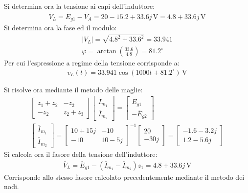 \documentclass{article}
\newcommand{\SI}[1]{\,\mathrm{#1}}
\begin{document}
Si determina ora la tensione ai capi dell'induttore:
\begin{gather*}
    \overline{V}_L=\overline{E}_{g1}-\overline{V}_A=20-15.2+33.6j\SI{V}=4.8+33.6j\SI{V}
\end{gather*}
Si determina ora la fase ed il modulo:
\begin{gather*}
    |V_L|=\sqrt{4.8^2+33.6^2}=33.941\\
    \varphi=\arctan\left(\displaystyle\frac{33.6}{4.8}\right)=81.2^{\circ}
\end{gather*}
Per cui l'espressione a regime della tensione corrisponde a:
\begin{gather}
    v_L(t)=33.941\cos(1000t+81.2^{\circ})\SI{V}
\end{gather}

Si risolve ora mediante il metodo delle maglie:
\begin{gather*}
    \begin{bmatrix}
        z_1+z_2&-z_2\\-z_2&z_2+z_3
    \end{bmatrix}\begin{bmatrix}
        \overline{I}_{m_1}\\\overline{I}_{m_2}
    \end{bmatrix}=\begin{bmatrix}
        \overline{E}_{g1}\\
        -\overline{E}_{g2}
    \end{bmatrix}\\
    \begin{bmatrix}
        \overline{I}_{m_1}\\\overline{I}_{m_2}
    \end{bmatrix}=\begin{bmatrix}
        10+15j&-10\\-10&10-5j
    \end{bmatrix}^{-1}\begin{bmatrix}
        20\\-30j
    \end{bmatrix}=\begin{bmatrix}
        -1.6-3.2j\\1.2-5.6j
    \end{bmatrix}
\end{gather*}
Si calcola ora il fasore della tensione dell'induttore:
\begin{gather*}
    \overline{V}_L=\overline{E}_{g1}-(\overline{I}_{m_1}-\overline{I}_{m_2})z_1=4.8+33.6j\SI{V}
\end{gather*}
Corrisponde allo stesso fasore calcolato precedentemente mediante il metodo dei nodi.
\end{document}
